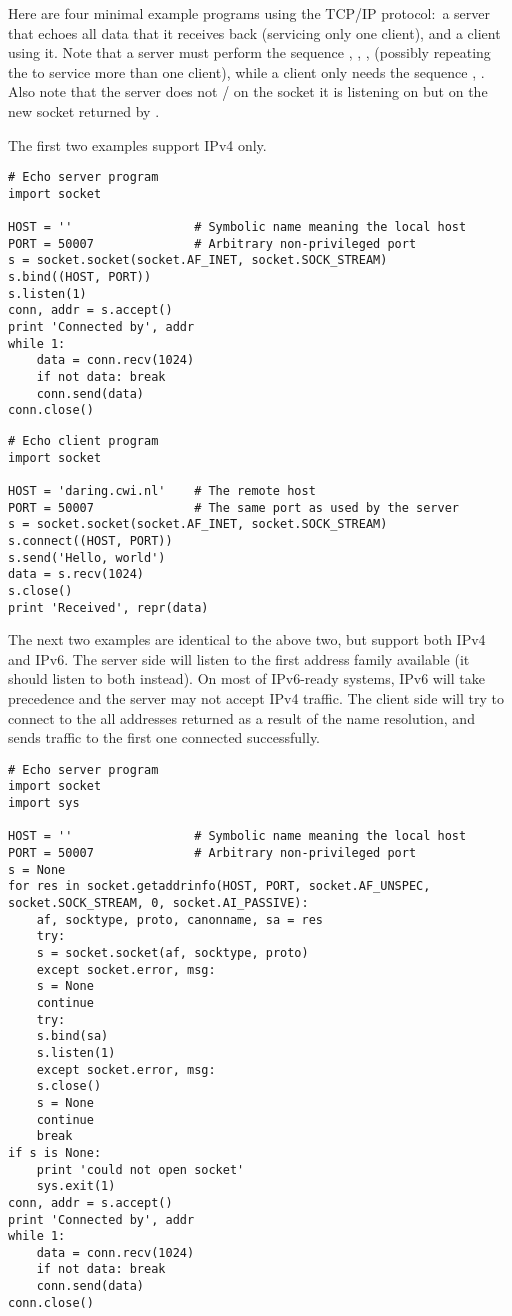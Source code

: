 Here are four minimal example programs using the TCP/IP protocol:\ a
server that echoes all data that it receives back (servicing only one
client), and a client using it.  Note that a server must perform the
sequence , , ,
 (possibly repeating the  to service
more than one client), while a client only needs the sequence
, .  Also note that the server
does not / on the 
socket it is listening on but on the new socket returned by
.

The first two examples support IPv4 only.

\begin{verbatim}
# Echo server program
import socket

HOST = ''                 # Symbolic name meaning the local host
PORT = 50007              # Arbitrary non-privileged port
s = socket.socket(socket.AF_INET, socket.SOCK_STREAM)
s.bind((HOST, PORT))
s.listen(1)
conn, addr = s.accept()
print 'Connected by', addr
while 1:
    data = conn.recv(1024)
    if not data: break
    conn.send(data)
conn.close()
\end{verbatim}

\begin{verbatim}
# Echo client program
import socket

HOST = 'daring.cwi.nl'    # The remote host
PORT = 50007              # The same port as used by the server
s = socket.socket(socket.AF_INET, socket.SOCK_STREAM)
s.connect((HOST, PORT))
s.send('Hello, world')
data = s.recv(1024)
s.close()
print 'Received', repr(data)
\end{verbatim}

The next two examples are identical to the above two, but support both
IPv4 and IPv6.
The server side will listen to the first address family available
(it should listen to both instead).
On most of IPv6-ready systems, IPv6 will take precedence
and the server may not accept IPv4 traffic.
The client side will try to connect to the all addresses returned as a result
of the name resolution, and sends traffic to the first one connected
successfully.

\begin{verbatim}
# Echo server program
import socket
import sys

HOST = ''                 # Symbolic name meaning the local host
PORT = 50007              # Arbitrary non-privileged port
s = None
for res in socket.getaddrinfo(HOST, PORT, socket.AF_UNSPEC, socket.SOCK_STREAM, 0, socket.AI_PASSIVE):
    af, socktype, proto, canonname, sa = res
    try:
	s = socket.socket(af, socktype, proto)
    except socket.error, msg:
	s = None
	continue
    try:
	s.bind(sa)
	s.listen(1)
    except socket.error, msg:
	s.close()
	s = None
	continue
    break
if s is None:
    print 'could not open socket'
    sys.exit(1)
conn, addr = s.accept()
print 'Connected by', addr
while 1:
    data = conn.recv(1024)
    if not data: break
    conn.send(data)
conn.close()
\end{verbatim}


